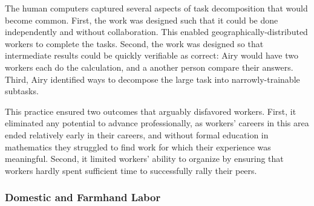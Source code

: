 \documentclass[trackingWork]{subfiles}
\begin{document}
The human computers captured several aspects of task decomposition that would become common. First, the work was designed such that it could be done independently and without collaboration. This enabled geographically-distributed workers to complete the tasks. Second, the work was designed so that intermediate results could be quickly verifiable as correct: Airy would have two workers each do the calculation, and a another person compare their answers. Third, Airy identified ways to decompose the large task into narrowly-trainable subtasks.

This practice ensured two outcomes that arguably disfavored workers.
First, it eliminated any potential to advance professionally, as
workers' careers in this area ended relatively early in their careers,
and without formal education in mathematics they struggled to find work for which their experience was meaningful.
Second, it limited workers' ability to organize
by ensuring that workers hardly spent sufficient time to successfully rally their peers.


\subsubsection{Domestic and Farmhand Labor}

\begin{comment}
What did I pull from the threads that are related to domestic/farmwork?

- Graves: sparks of Scientific Management in Piecework, especially starting here
- 19th century: piecework was mostly cottage industry with untrained or informally trained workers
  (unlike industrial metal workers during WWII)
- Brown: Task variability matters
- Clark: pieceworkers work harder, more diligently, etc...
- Riis saw terrible conditions, documented and communicated it to the world

\citeauthor{clark1908cotton} observed textile mill pieceworkers and reported,
``When he works by the day the Italian operative wishes to leave before the whistle blows,
but if he works by the piece he will work as many hours as it is possible for him to stand''~\cite{clark1908cotton}.


\end{comment}
\end{document}
